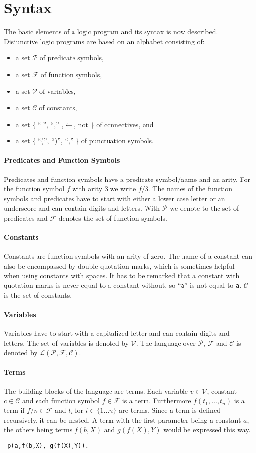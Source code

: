 \documentclass[a4paper,10pt]{article}
\begin{document}
\section{Syntax}
The basic elements of a logic program and its syntax is now described.
Disjunctive logic programs are based on an alphabet \cite{syntax} consisting of:
\begin{itemize}
\item a set $\mathcal{P}$ of predicate symbols,
\item a set $\mathcal{F}$ of function symbols,
\item a set $\mathcal{V}$ of variables,
\item a set $\mathcal{C}$ of constants,
\item a set \{ ``$\mid$'', ``,'' ,$\leftarrow$, not \} of connectives, and
\item a set \{ ``('', ``)'', ``,'' \} of punctuation symbols.
\end{itemize}

\paragraph{Predicates and Function Symbols}
Predicates and function symbols have a predicate symbol/name and an arity.
For the function symbol $f$ with arity 3 we write $f/3$.
The names of the function symbols and predicates have to start with either a lower case letter or an underscore and can contain digits and letters.
With $\mathcal{P}$ we denote to the set of predicates and $\mathcal{F}$ denotes the set of function symbols.
\paragraph{Constants}
Constants are function symbols with an arity of zero.
The name of a constant can also be encompassed by double quotation marks, which is sometimes helpful when using constants with spaces. It has to be remarked that a constant with quotation marks is never equal to a constant without, so ``\texttt{a}'' is not equal to \texttt{a}.
$\mathcal{C}$ is the set of constants.
\paragraph{Variables}
Variables have to start with a capitalized letter and can contain digits and letters.
The set of variables is denoted by $\mathcal{V}$.
The language over $\mathcal{P}$, $\mathcal{F}$ and $\mathcal{C}$ is denoted by $\mathcal{L(P,F,C)}$.
\paragraph{Terms}
The building blocks of the language are terms.
Each variable $v \in \mathcal{V}$, constant $c \in \mathcal{C}$ and each function symbol $f \in \mathcal{F}$ is a term.
Furthermore $f(t_1, \dots, t_n)$ is a term if $f/n \in \mathcal{F}$ and $t_i$ for $i \in \{1 \dots n\}$ are terms.
Since a term is defined recursively, it can be nested.
A term with the first parameter being a constant $a$, the others being terms $f(b,X)$ and $g(f(X), Y)$ would be expressed this way.
\begin{verbatim}
 p(a,f(b,X), g(f(X),Y)).
\end{verbatim}
\end{document}
